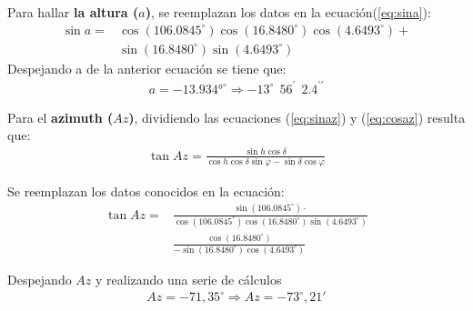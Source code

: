\begin{multicols}{2}
   Para hallar \textbf{la altura ($a$)}, se reemplazan los datos en la ecuación(\ref{eq:sina}):
   \begin{align*}
       \sin a = &  \cos \left(106.0845 ^{\circ}\right)  \cos \left(16.8480^{\circ}\right) \cos \left(4.6493^{\circ}\right) + \\
       & \sin \left(16.8480^{\circ}\right) \sin \left(4.6493^{\circ}\right)
   \end{align*}
   Despejando a de la anterior ecuación se tiene que:
   \begin{align*}
   a = -13.934°^{\circ}  \Longrightarrow -13^{\circ}~~ 56^{\prime}~~ 2.4^{\prime \prime}
   \end{align*}
   
   Para el\textbf{ azimuth ($Az$)}, dividiendo las ecuaciones (\ref{eq:sinaz}) y (\ref{eq:cosaz}) resulta que:
   \begin{align}
       \tan Az = \frac{\sin h \cos \delta}{\cos h \cos \delta \sin \varphi - \sin \delta \cos \varphi}
   \end{align}
   
   
   
   Se reemplazan los datos conocidos en la ecuación:
   \begin{align*}
       \tan Az  = & \frac{\sin \left(106.0845 ^{\circ}\right) \cdot }{\cos\left(106.0845 ^{\circ}\right)  \cos  \left(16.8480^{\circ}\right)  \sin \left(4.6493^{\circ}\right)}\\
        & \frac{\cos  \left(16.8480^{\circ}\right)}{- \sin \left(16.8480^{\circ}\right) \cos  \left(4.6493^{\circ}\right)}
   \end{align*}
   
   
   Despejando $Az$ y realizando una serie de cálculos
   \begin{align}
   Az = -71,35 ^{\circ} \Longrightarrow
   Az = -73 ^{\circ}, 21' %
   \end{align}
   

\end{multicols}
